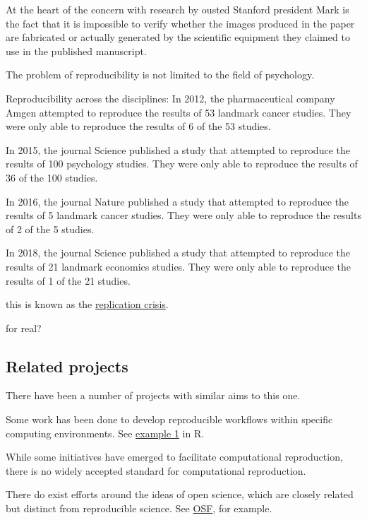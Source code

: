 At the heart of the concern with research by ousted Stanford president Mark is the fact that it is impossible to verify whether the images produced in the paper are fabricated or actually generated by the scientific equipment they claimed to use in the published manuscript.

The problem of reproducibility is not limited to the field of psychology. 

Reproducibility across the disciplines:
In 2012, the pharmaceutical company Amgen attempted to reproduce the results of 53 landmark cancer studies. They were only able to reproduce the results of 6 of the 53 studies.

In 2015, the journal Science published a study that attempted to reproduce the results of 100 psychology studies. They were only able to reproduce the results of 36 of the 100 studies.

In 2016, the journal Nature published a study that attempted to reproduce the results of 5 landmark cancer studies. They were only able to reproduce the results of 2 of the 5 studies.

In 2018, the journal Science published a study that attempted to reproduce the results of 21 landmark economics studies. They were only able to reproduce the results of 1 of the 21 studies.

this is known as the \href{https://en.wikipedia.org/wiki/Replication\_crisis}{replication crisis}.

for real?

\hypertarget{related-projects}{%
\subsection{Related projects}\label{related-projects}}

There have been a number of projects with similar aims to this one.

Some work has been done to develop reproducible workflows within specific computing environments. See \href{https://mine-cetinkaya-rundel.github.io/improve-repro-workflow-reproducibilitea-2020/}{example 1} in R.

While some initiatives have emerged to facilitate computational reproduction, there is no widely accepted standard for computational reproduction. 

There do exist efforts around the ideas of open science, which are closely related but distinct from reproducible science. See \href{https://osf.io/tvyxz/}{OSF}, for example.

